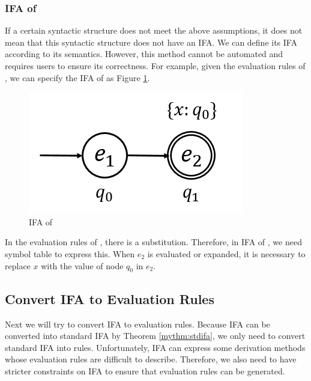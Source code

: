 \subsubsection{IFA of }

If a certain syntactic structure does not meet the above assumptions, it does not mean that this syntactic structure does not have an IFA. We can define its IFA according to its semantics. However, this method cannot be automated and requires users to ensure its correctness. For example, given the evaluation rules of , we can specify the IFA of  as Figure \ref{fig:ifa-let}.


\begin{figure}[t]
    \centering
    \includegraphics[scale=0.3]{images/ifa-let.png}
    \caption{IFA of }
    \label{fig:ifa-let}
\end{figure}

In the evaluation rules of , there is a substitution. Therefore, in IFA of , we need symbol table to express this. When $e_2$ is evaluated or expanded, it is necessary to replace $x$ with the value of node $q_0$ in $e_2$.

\subsection{Convert IFA to Evaluation Rules}

Next we will try to convert IFA to evaluation rules. Because IFA can be converted into standard IFA by Theorem \ref{mythm:stdifa}, we only need to convert standard IFA into rules. Unfortunately, IFA can express some derivation methods whose evaluation rules are difficult to describe. Therefore, we also need to have stricter constraints on IFA to ensure that evaluation rules can be generated.

